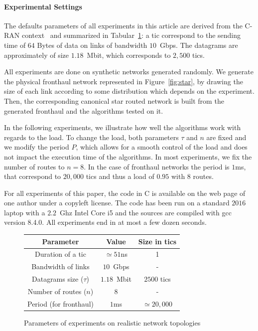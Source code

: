 \documentclass[a4paper,10pt]{journal}
\begin{document}
   \paragraph{Experimental Settings}


     The defaults parameters of all experiments in this article are derived from the C-RAN context~\cite{wang2017cloud} and summarized in Tabular~\ref{tab:params}: a tic correspond to the sending time of $64$ Bytes of data on links of bandwidth $10$~Gbps. The datagrams are approximately of size $1.18$~Mbit, which corresponds to $2,500$ tics. 

     All experiments are done on synthetic networks generated randomly. We generate the physical fronthaul
     network represented in Figure~\ref{fig:star}, by drawing the size of each link according 
     to some distribution which depends on the experiment. Then, the corresponding canonical star routed network is built from the generated fronthaul and the algorithms tested on it. 

     In the following experiments, we illustrate how well the algorithms work with regards to the load. To change the load, both parameters $\tau$ and $n$ are fixed and we modify the period $P$, which allows for a smooth control of the load and does not impact the execution time of the algorithms. In most experiments, we fix the number of routes to $n = 8$. In the case of fronthaul networks the period is $1$ms, that correspond to $20,000$ tics and thus a load of $0.95$ with 8 routes.

     For all experiments of this paper, the code in C is available on the web page of one author\cite{webpage} under a copyleft license. The code has been run on a standard $2016$ laptop with a $2.2$~Ghz Intel Core i5 and the sources are compiled with gcc version 8.4.0. All experiments end in at most a few dozen seconds.

\begin{figure}
\begin{center}
\begin{tabular}{|c|c|c|}
\hline
Parameter& Value & Size in tics \\
\hline
Duration of a tic& $\simeq51$ns&1\\
\hline
Bandwidth of links &  $10$~Gbps & -\\
\hline
Datagrams size ($\tau$)&  $1.18$~Mbit & $2500$ tics\\
\hline
Number of routes ($n$) & $8$ & -\\
\hline
Period (for fronthaul)& $1$ms&$\simeq20,000$\\
\hline
\end{tabular}

\end{center}
\label{tab:params}
\caption{Parameters of experiments on realistic network topologies}
\end{figure}
\end{document}
